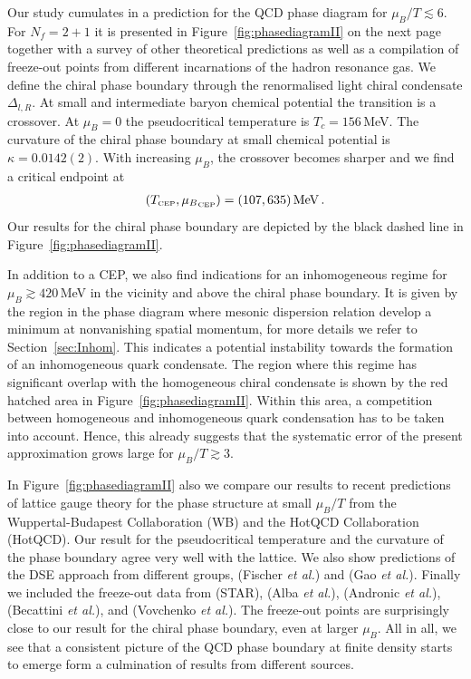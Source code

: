 \documentclass[%
reprint,
superscriptaddress,
showpacs,preprintnumbers,
 amsmath,amssymb,
 aps,
prd,
]{revtex4-1}
\def\Fig#1{Figure~\ref{#1}}
\def\sec#1{Section~\ref{#1}}
\begin{document}
Our study cumulates in a prediction for the QCD phase diagram for
$\mu_B/T \lesssim 6$. For $N_f=2+1$ it is presented in
\Fig{fig:phasediagramII} on the next page together with a survey of
other theoretical predictions as well as a compilation of freeze-out
points from different incarnations of the hadron resonance gas. We
define the chiral phase boundary through the renormalised light chiral
condensate $\Delta_{l,R}$. At small and intermediate baryon chemical
potential the transition is a crossover. At $\mu_B = 0$ the
pseudocritical temperature is $T_c = 156$\,MeV. The curvature of the
chiral phase boundary at small chemical potential is
\mbox{$\kappa=0.0142(2)$}. With increasing $\mu_B$, the crossover
becomes sharper and we find a critical endpoint at
\begin{align}
(T_\text{\tiny CEP},{\mu_B}_{\text{\tiny CEP}})=(107, 635)\,\text{MeV}\,.
\end{align}
Our results for the chiral phase boundary are depicted by the black
dashed line in \Fig{fig:phasediagramII}.


In addition to a CEP, we also find indications for an inhomogeneous
regime for $\mu_B \gtrsim 420$\,MeV in the vicinity and above the
chiral phase boundary. It is given by the region in the phase diagram
where mesonic dispersion relation develop a minimum at nonvanishing
spatial momentum, for more details we refer to \sec{sec:Inhom}. This
indicates a potential instability towards the formation of an
inhomogeneous quark condensate. The region where this regime has
significant overlap with the homogeneous chiral condensate is shown by
the red hatched area in \Fig{fig:phasediagramII}. Within
this area, a competition between homogeneous and inhomogeneous quark
condensation has to be taken into account. Hence, this already
suggests that the systematic error of the present approximation grows
large for $\mu_B/T \gtrsim 3$.

In \Fig{fig:phasediagramII} also we compare our results to recent
predictions of lattice gauge theory for the phase structure at small
$\mu_B/T$ from the Wuppertal-Budapest Collaboration
\cite{Bellwied:2015rza} (WB) and the HotQCD Collaboration
\cite{Bazavov:2018mes} (HotQCD). Our result for the pseudocritical
temperature and the curvature of the phase boundary agree very well
with the lattice. We also show predictions of the DSE approach from
different groups, \cite{Fischer:2014ata} (Fischer {\it et al.}) and
\cite{Gao:2015kea} (Gao {\it et al.}). Finally we included the
freeze-out data from \cite{Adamczyk:2017iwn} (STAR),
\cite{Alba:2014eba} (Alba {\it et al.}), \cite{Andronic:2017pug}
(Andronic {\it et al.}), \cite{Becattini:2016xct} (Becattini {\it et
  al.}), and \cite{Vovchenko:2015idt} (Vovchenko {\it et al.}). The
freeze-out points are surprisingly close to our result for the chiral
phase boundary, even at larger $\mu_B$.  All in all, we see that a
consistent picture of the QCD phase boundary at finite density starts
to emerge form a culmination of results from different sources.
\end{document}
